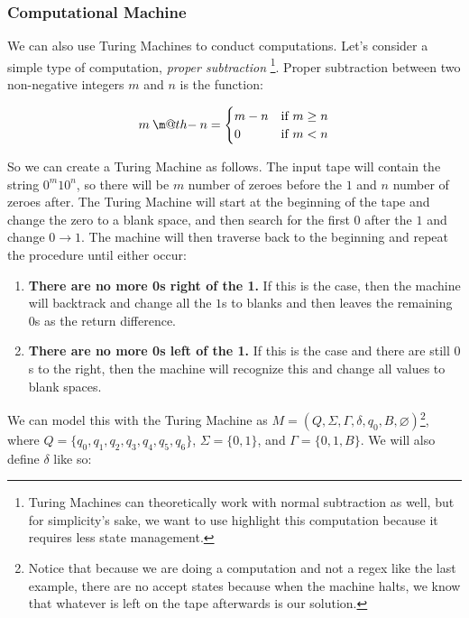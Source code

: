 \documentclass[11pt]{article}
\makeatletter
\newcommand{\dotminus}{\mathbin{\text{\@dotminus}}}
\newcommand{\@dotminus}{%
  \ooalign{\hidewidth\raise1ex\hbox{.}\hidewidth\cr$\m@th-$\cr}%
}
\makeatother
\begin{document}
\subsubsection*{Computational Machine}

We can also use Turing Machines to conduct computations. Let's consider a simple type of computation, \textit{proper subtraction} \footnote{Turing Machines can theoretically work with normal subtraction as well, but for simplicity's sake, we want to use highlight this computation because it requires less state management.}. Proper subtraction between two non-negative integers $m$ and $n$ is the function:

\[
m \dotminus n =  
\begin{cases} 
      m-n & \text{if $m\geq n$} \\
      0 & \text{if $m<n$}
   \end{cases}
\]

So we can create a Turing Machine as follows. The input tape will contain the string $0^m10^n$, so there will be $m$ number of zeroes before the $1$ and $n$ number of zeroes after. The Turing Machine will start at the beginning of the tape and change the zero to a blank space, and then search for the first $0$ after the $1$ and change $0 \to 1$. The machine will then traverse back to the beginning and repeat the procedure until either occur:

\begin{enumerate}

\item \textbf{There are no more 0s right of the 1.} If this is the case, then the machine will backtrack and change all the $1$s to blanks and then leaves the remaining $0$s as the return difference. 
\item \textbf{There are no more 0s left of the 1.} If this is the case and there are still $0$s to the right, then the machine will recognize this and change all values to blank spaces.

\end {enumerate}

We can model this with the Turing Machine as $M=(Q,\Sigma, \Gamma, \delta, q_0, B, \varnothing)$\footnote{Notice that because we are doing a computation and not a regex like the last example, there are no accept states because when the machine halts, we know that whatever is left on the tape afterwards is our solution.}, where $Q = \{q_0, q_1, q_2, q_3, q_4, q_5, q_6 \}$, $\Sigma = \{0,1\}$, and $\Gamma = \{0,1,B\}$. We will also define $\delta$ like so:
\end{document}
